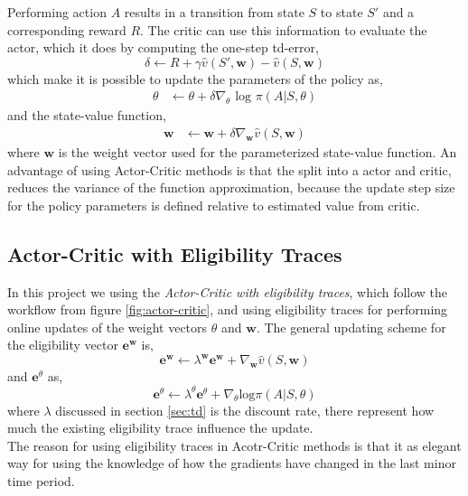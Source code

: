 \documentclass[11pt]{article}
\begin{document}
Performing action $A$ results in a transition from state $S$ to state $S'$ and a corresponding reward $R$. The critic can use this information to evaluate the actor, which it does by computing the one-step td-error,
\begin{equation}
    \delta \leftarrow R + \gamma \hat{v} (S', \mathbf{w}) - \hat{v}(S, \mathbf{w})
\end{equation}
which make it is possible to update the parameters of the policy as,
\begin{equation}
\begin{split}
    \theta &\leftarrow \theta + \delta \nabla_{\theta} \text{ log } \pi(A | S, \theta)
\end{split}
\end{equation}
and the state-value function,
\begin{equation}
\begin{split}
    \mathbf{w} &\leftarrow \mathbf{w} + \delta \nabla_{\mathbf{w}} \hat{v}(S, \mathbf{w})
\end{split}
\end{equation}
where $\mathbf{w}$ is the weight vector used for the parameterized state-value function.
An advantage of using Actor-Critic methods is that the split into a actor and critic, reduces the variance of the function approximation, because the update step size for the policy parameters is defined relative to estimated value from critic.\cite{actCrit}


\subsection{Actor-Critic with Eligibility Traces}

In this project we using the \textit{Actor-Critic with eligibility traces}, which follow the workflow from figure \ref{fig:actor-critic}, and using eligibility traces for performing online updates of the weight vectors $\theta$ and $\mathbf{w}$. The general updating scheme for the eligibility vector $\mathbf{e}^{\mathbf{w}}$ is,
\begin{equation}
    \mathbf{e}^{\mathbf{w}} \leftarrow \lambda^{\mathbf{w}} \mathbf{e}^{\mathbf{w}} + \nabla_{\mathbf{w}} \hat{v}(S, \mathbf{w})
\end{equation}
and $\mathbf{e}^{\theta}$ as,
\begin{equation}
    \mathbf{e}^{\theta} \leftarrow \lambda^{\theta} \mathbf{e}^{\theta} + \nabla_{\theta} \text{log} \pi (A | S, \theta)
\end{equation}
where $\lambda$ discussed in section \ref{sec:td} is the discount rate, there represent how much the existing eligibility trace influence the update.
\\
The reason for using eligibility traces in Acotr-Critic methods is that it as elegant way for using the knowledge of how the gradients have changed in the last minor time period.
\end{document}
